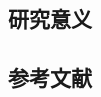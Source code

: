 
\subsection{研究意义}
\vspace{-5pt}

\cite{test}

\begin{REF}
\subsection*{参考文献}
\vspace{-50pt}

\end{REF}

